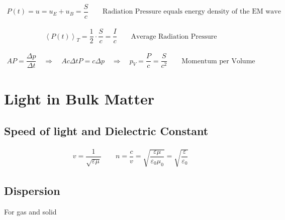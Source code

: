 \begin{equation*}
  \begin{aligned}
    P(t) = u = u_E + u_B = \dfrac{S}{c} \quad\quad \text{Radiation Pressure equals energy density of the EM wave} 
  \end{aligned}
\end{equation*}

\begin{equation*}
  \begin{aligned}
    \left< P(t) \right>_T = \dfrac{1}{2} \cdot \dfrac{S}{c} = \dfrac{I}{c} \quad\quad \text{Average Radiation Pressure} 
  \end{aligned}
\end{equation*}

\begin{equation*}
  \begin{aligned}
    AP = \dfrac{\Delta p}{\Delta t}
    \quad \Rightarrow \quad
    Ac \Delta t P = c \Delta p
    \quad \Rightarrow \quad 
    p_V = \dfrac{P}{c} = \dfrac{S}{c^2} \quad\quad \text{Momentum per Volume} 
  \end{aligned}
\end{equation*}

\section{Light in Bulk Matter}

\subsection{Speed of light and Dielectric Constant}

\begin{equation*}
  \begin{aligned}
    v = \dfrac{1}{\sqrt{\varepsilon \mu}} 
    \quad\quad 
    n = \dfrac{c}{v} = \sqrt{\dfrac{\varepsilon \mu}{\varepsilon_0 \mu_0} } = \sqrt{\dfrac{\varepsilon}{\varepsilon_0} }
  \end{aligned}
\end{equation*}

\subsection{Dispersion}

For gas and solid

